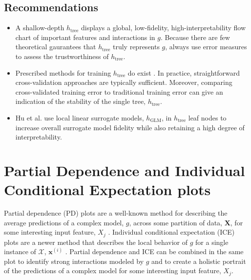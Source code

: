 \documentclass[11pt]{asaproc}
\begin{document}
\subsection{Recommendations}

\begin{itemize}
	
	\item A shallow-depth $h_{\text{tree}}$ displays a global, low-fidelity, high-interpretability flow chart of important features and interactions in $g$. Because there are few theoretical gaurantees that $h_{\text{tree}}$ truly represents $g$, always use error measures to assess the trustworthiness of $h_{\text{tree}}$.
	
	\item Prescribed methods for training $h_{\text{tree}}$ do exist \cite{dt_surrogate1} \cite{dt_surrogate2}. In practice, straightforward cross-validation approaches are typically sufficient. Moreover, comparing cross-validated training error to traditional training error can give an indication of the stability of the single tree, $h_{\text{tree}}$.
	
	\item Hu et al. use local linear surrogate models, $h_{\text{GLM}}$, in $h_{\text{tree}}$ leaf nodes to increase overall surrogate model fidelity while also retaining a high degree of interpretability.
	
\end{itemize}

\section{Partial Dependence and Individual Conditional Expectation plots}
\label{sec:pd_ice}

Partial dependence (PD) plots are a well-known method for describing the average predictions of a complex model, $g$, across some partition of data, $\mathbf{X}$, for some interesting input feature, $X_j$ \cite{esl}. Individual conditional expectation (ICE) plots are a newer method that describes the local behavior of $g$ for a single instance of $\mathcal{X}$, $\mathbf{x}^{(i)}$ \cite{ice_plots}. Partial dependence and ICE can be combined in the same plot to identify strong interactions modeled by $g$ and to create a holistic portrait of the predictions of a complex model for some interesting input feature, $X_j$.
\end{document}
